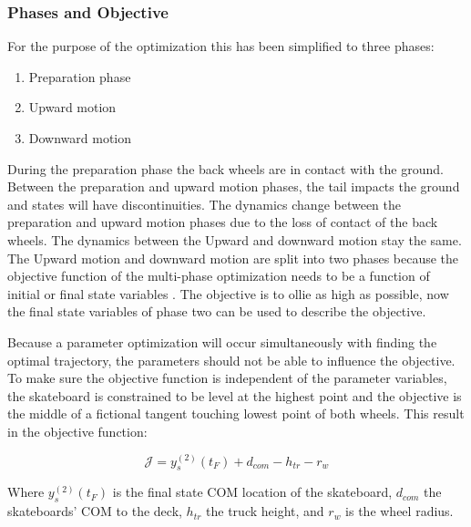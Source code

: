 \documentclass[default,iicol]{sn-jnl}
\theoremstyle{thmstyleone}%
\theoremstyle{thmstyletwo}%
\theoremstyle{thmstylethree}%
\begin{document}
\subsubsection{Phases and Objective} \label{s_phases}
For the purpose of the optimization this has been simplified to three phases:
\begin{enumerate} \label{n_phases}
    \item Preparation phase 
    \item Upward motion 
    \item Downward motion 
\end{enumerate}
\noindent During the preparation phase the back wheels are in contact with the ground. Between the preparation and upward motion phases, the tail impacts the ground and states will have discontinuities. The dynamics change between the preparation and upward motion phases due to the loss of contact of the back wheels. The dynamics between the Upward and downward motion stay the same. The Upward motion and downward motion are split into two phases because the objective function of the multi-phase optimization needs to be a function of initial or final state variables \cite{brockie_predictive_nodate}. The objective is to ollie as high as possible, now the final state variables of phase two can be used to describe the objective. 

Because a parameter optimization will occur simultaneously with finding the optimal trajectory, the parameters should not be able to influence the objective. To make sure the objective function is independent of the parameter variables, the skateboard is constrained to be level at the highest point and the objective is the middle of a fictional tangent touching lowest point of both wheels. This result in the objective function:

\begin{equation}
    \mathcal{J} = y_s^{(2)}(t_F) + d_{com} - h_{tr} - r_w 
\end{equation}

\noindent Where $y_s^{(2)}(t_F)$ is the final state COM location of the skateboard, $d_{com}$ the skateboards' COM to the deck, $h_{tr}$ the truck height, and $r_w$ is the wheel radius.
\end{document}
